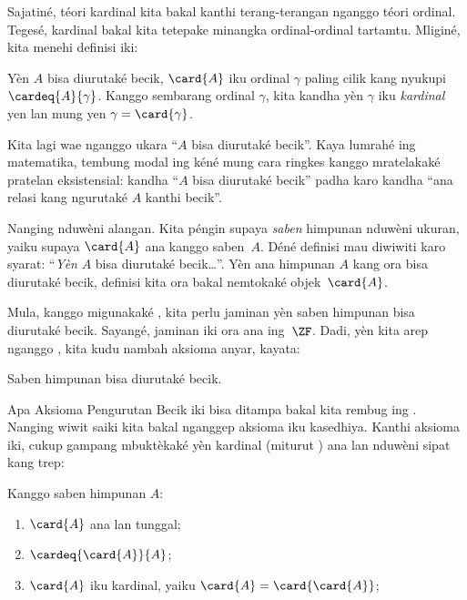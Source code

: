 \documentclass[../../../include/open-logic-section]{subfiles}
\begin{document}

Sajatiné, téori kardinal kita bakal kanthi terang-terangan
nganggo téori ordinal. Tegesé, kardinal bakal kita tetepake
minangka ordinal-ordinal tartamtu. Mliginé, kita menehi
definisi iki:

\begin{defn}
Yèn $A$ bisa diurutaké becik, $\card{A}$ iku ordinal
$\gamma$ paling cilik kang nyukupi $\cardeq{A}{\gamma}$. Kanggo
sembarang ordinal $\gamma$, kita kandha yèn $\gamma$ iku
\emph{kardinal} yen lan mung yen $\gamma = \card{\gamma}$.
\end{defn}

Kita lagi wae nganggo ukara “$A$ bisa diurutaké becik”.
Kaya lumrahé ing matematika, tembung modal ing kéné mung cara
ringkes kanggo mratelakaké pratelan eksistensial: kandha
“$A$ bisa diurutaké becik” padha karo kandha
“ana relasi kang ngurutaké $A$ kanthi becik”.

Nanging  nduwèni alangan. Kita
péngin supaya \emph{saben} himpunan nduwèni ukuran, yaiku supaya
$\card{A}$ ana kanggo saben~$A$. Déné definisi mau diwiwiti
karo syarat: “\emph{Yèn} $A$ bisa diurutaké becik\ldots”.
Yèn ana himpunan $A$ kang ora bisa diurutaké becik, definisi
kita ora bakal nemtokaké objek~$\card{A}$.

Mula, kanggo migunakaké , kita perlu
jaminan yèn saben himpunan bisa diurutaké becik. Sayangé,
jaminan iki ora ana ing~$\ZF$. Dadi, yèn kita arep nganggo
, kita kudu nambah aksioma anyar,
kayata:
\begin{axiom}
Saben himpunan bisa diurutaké becik.
\end{axiom}
Apa Aksioma Pengurutan Becik iki bisa ditampa bakal kita rembug
ing . Nanging wiwit saiki kita bakal
nganggep aksioma iku kasedhiya. Kanthi aksioma iki, cukup
gampang mbuktèkaké yèn kardinal (miturut
) ana lan nduwèni sipat kang trep:

\begin{lem}
Kanggo saben himpunan $A$:
\begin{enumerate}
	\item{} $\card{A}$ ana lan tunggal;
	\item{} $\cardeq{\card{A}}{A}$;
	\item{} $\card{A}$ iku kardinal, yaiku
	$\card{A} = \card{\card{A}}$;
\end{enumerate}
\end{lem}
\end{document}
